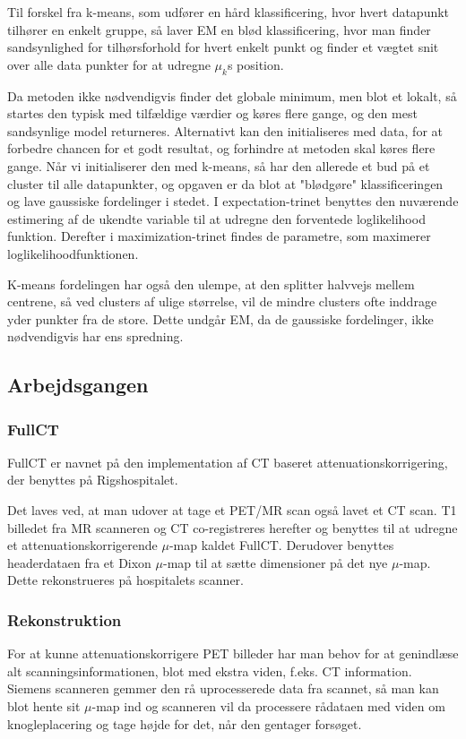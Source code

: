 Til forskel fra k-means, som udfører en hård klassificering, hvor hvert
datapunkt tilhører en enkelt gruppe, så laver EM en blød klassificering,
hvor
man finder sandsynlighed for tilhørsforhold for hvert enkelt punkt og
finder et
vægtet snit over alle data punkter for at udregne $\mu_k$s position.

Da metoden ikke nødvendigvis finder det globale minimum, men blot et
lokalt,
så startes den typisk med tilfældige værdier og køres flere gange, og
den mest sandsynlige model returneres. Alternativt kan den initialiseres
med
data, for at forbedre chancen for et godt resultat, og forhindre at
metoden
skal køres flere gange. Når vi initialiserer den med k-means, så har den
allerede et bud på et cluster til alle datapunkter, og opgaven er da blot
at "blødgøre" klassificeringen og lave gaussiske fordelinger i stedet. I
expectation-trinet benyttes den nuværende estimering af de ukendte
variable til
at udregne den forventede loglikelihood funktion. Derefter i
maximization-trinet findes de parametre, som maximerer
loglikelihoodfunktionen.

K-means fordelingen har også den ulempe, at den splitter halvvejs mellem
centrene, så ved clusters af ulige størrelse, vil de mindre clusters ofte
inddrage yder punkter fra de store. Dette undgår EM, da de gaussiske
fordelinger, ikke nødvendigvis har ens spredning.


\subsection{Arbejdsgangen}


\subsubsection{FullCT}

FullCT er navnet på den implementation af CT baseret
attenuationskorrigering, der benyttes på Rigshospitalet.

Det laves ved, at man udover at tage et PET/MR scan også lavet et CT
scan. T1 billedet fra MR scanneren og CT co-registreres herefter
og benyttes til at udregne et attenuationskorrigerende $\mu$-map kaldet
FullCT. Derudover benyttes headerdataen fra et Dixon $\mu$-map til at sætte
dimensioner på det nye $\mu$-map. Dette rekonstrueres på hospitalets
scanner.


\subsubsection{Rekonstruktion}

For at kunne attenuationskorrigere PET billeder har man behov for at
genindlæse alt scanningsinformationen, blot med ekstra viden, f.eks.
CT information. Siemens scanneren gemmer den rå uprocesserede data fra
scannet, så man kan blot hente sit $\mu$-map ind og scanneren vil da
processere rådataen med viden om knogleplacering og tage højde for det,
når den gentager forsøget.

